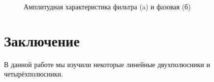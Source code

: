 \begin{figure}[H]
	\begin{minipage}[h]{0.49\linewidth}
	\end{minipage}
	\hfill
	\begin{minipage}[h]{0.49\linewidth}
	\end{minipage}
	\caption{Амплитудная характеристика фильтра (a) и фазовая (б)}
	\label{ris:ris6}
\end{figure}
\newpage
\section{Заключение}
В данной работе мы изучили некоторые линейные двухполюсники и четырёхполюсники.
 
